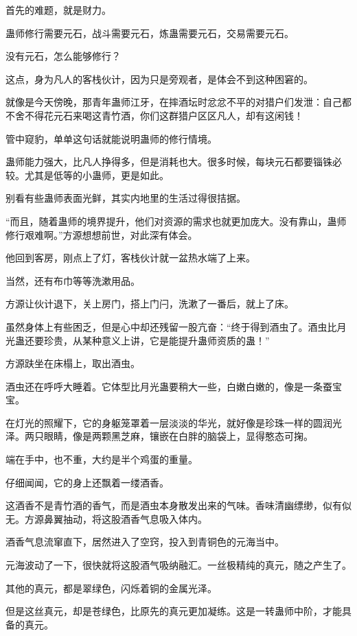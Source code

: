 \begin{this_body}
首先的难题，就是财力。

蛊师修行需要元石，战斗需要元石，炼蛊需要元石，交易需要元石。

没有元石，怎么能够修行？

这点，身为凡人的客栈伙计，因为只是旁观者，是体会不到这种困窘的。

就像是今天傍晚，那青年蛊师江牙，在摔酒坛时忿忿不平的对猎户们发泄：自己都不舍不得花元石来喝这青竹酒，你们这群猎户区区凡人，却有这闲钱！

管中窥豹，单单这句话就能说明蛊师的修行情境。

蛊师能力强大，比凡人挣得多，但是消耗也大。很多时候，每块元石都要锱铢必较。尤其是低等的小蛊师，更是如此。

别看有些蛊师表面光鲜，其实内地里的生活过得很拮据。

“而且，随着蛊师的境界提升，他们对资源的需求也就更加庞大。没有靠山，蛊师修行艰难啊。”方源想想前世，对此深有体会。

他回到客房，刚点上了灯，客栈伙计就一盆热水端了上来。

当然，还有布巾等等洗漱用品。

方源让伙计退下，关上房门，搭上门闩，洗漱了一番后，就上了床。

虽然身体上有些困乏，但是心中却还残留一股亢奋：“终于得到酒虫了。酒虫比月光蛊还要珍贵，从某种意义上讲，它是能提升蛊师资质的蛊！”

方源趺坐在床榻上，取出酒虫。

酒虫还在呼呼大睡着。它体型比月光蛊要稍大一些，白嫩白嫩的，像是一条蚕宝宝。

在灯光的照耀下，它的身躯笼罩着一层淡淡的华光，就好像是珍珠一样的圆润光泽。两只眼睛，像是两颗黑芝麻，镶嵌在白胖的脑袋上，显得憨态可掬。

端在手中，也不重，大约是半个鸡蛋的重量。

仔细闻闻，它的身上还飘着一缕酒香。

这酒香不是青竹酒的香气，而是酒虫本身散发出来的气味。香味清幽缥缈，似有似无。方源鼻翼抽动，将这股酒香气息吸入体内。

酒香气息流窜直下，居然进入了空窍，投入到青铜色的元海当中。

元海波动了一下，很快就将这股酒气吸纳融汇。一丝极精纯的真元，随之产生了。

其他的真元，都是翠绿色，闪烁着铜的金属光泽。

但是这丝真元，却是苍绿色，比原先的真元更加凝练。这是一转蛊师中阶，才能具备的真元。


\end{this_body}
